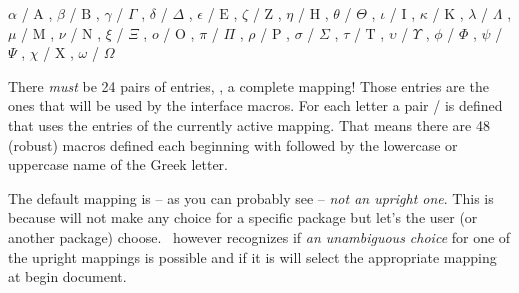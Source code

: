 \documentclass[load-preamble+]{cnltx-doc}
\begin{document}
\begin{sourcecode}
    {
      \ensuremath{\alpha}   / \ensuremath{\mathrm{A}} , %
      \ensuremath{\beta}    / \ensuremath{\mathrm{B}} , %
      \ensuremath{\gamma}   / \ensuremath{\Gamma} ,     %
      \ensuremath{\delta}   / \ensuremath{\Delta} ,     %
      \ensuremath{\epsilon} / \ensuremath{\mathrm{E}} , %
      \ensuremath{\zeta}    / \ensuremath{\mathrm{Z}} , %
      \ensuremath{\eta}     / \ensuremath{\mathrm{H}} , %
      \ensuremath{\theta}   / \ensuremath{\Theta} ,     %
      \ensuremath{\iota}    / \ensuremath{\mathrm{I}} , %
      \ensuremath{\kappa}   / \ensuremath{\mathrm{K}} , %
      \ensuremath{\lambda}  / \ensuremath{\Lambda} ,    %
      \ensuremath{\mu}      / \ensuremath{\mathrm{M}} , %
      \ensuremath{\nu}      / \ensuremath{\mathrm{N}} , %
      \ensuremath{\xi}      / \ensuremath{\Xi} ,        %
      \ensuremath{o}        / \ensuremath{\mathrm{O}} , %
      \ensuremath{\pi}      / \ensuremath{\Pi} ,        %
      \ensuremath{\rho}     / \ensuremath{\mathrm{P}} , %
      \ensuremath{\sigma}   / \ensuremath{\Sigma} ,     %
      \ensuremath{\tau}     / \ensuremath{\mathrm{T}} , %
      \ensuremath{\upsilon} / \ensuremath{\Upsilon} ,   %
      \ensuremath{\phi}     / \ensuremath{\Phi} ,       %
      \ensuremath{\psi}     / \ensuremath{\Psi} ,       %
      \ensuremath{\chi}     / \ensuremath{\mathrm{X}} , %
      \ensuremath{\omega}   / \ensuremath{\Omega}       %
  }
\end{sourcecode}

There \emph{must} be 24 pairs of entries, \ie, a complete mapping!  Those
entries are the ones that will be used by the interface macros.  For each
letter a pair / is defined that uses the entries
of the currently active mapping.  That means there are 48 (robust) macros
defined each beginning with  followed by the lowercase or
uppercase name of the Greek letter.

The default mapping is -- as you can probably see -- \emph{not an upright
  one}.  This is because \chemgreek{} will not make any choice for a specific
package but let's the user (or another package) choose.  \chemgreek\ however
recognizes if \emph{an unambiguous choice} for one of the upright mappings is
possible and if it is will select the appropriate mapping at begin document.
\end{document}
